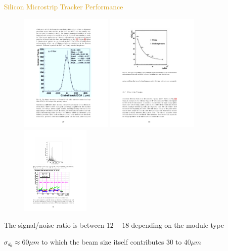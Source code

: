 \begin{frame}{\textcolor{Goldenrod}{Silicon Microstrip Tracker Performance }}
  \begin{overlayarea}{\textwidth}{\textheight}
    \begin{figure}[h]
      \centering
      \includegraphics[height=0.45\textheight,width=0.4\textwidth]{./Images/11_SMT_01}
      \includegraphics[height=0.45\textheight,width=0.4\textwidth]{./Images/12_SMT_01}
      \includegraphics[height=0.45\textheight,width=0.3\textwidth]{./Images/12_SMT_02}
      
    \end{figure}
    \itt
  \item The signal/noise ratio is between $12-18$
    depending on the module type
  \item \alert{{\small $\sigma_{d_0} \approx 60 \mu m$ to which the beam size itself
        contributes $30$ to $40 \mu m$}}
    

\end{overlayarea}
\end{frame}
